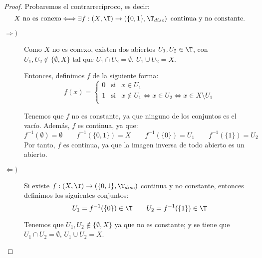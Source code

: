 \begin{proof}
    Probaremos el contrarrecíproco, es decir:
    \begin{equation*}
        X \text{ no es conexo} \Longleftrightarrow \exists f:(X,\T)\to \left(\{0,1\},\T_{disc}\right) \text{ continua y no constante.}
    \end{equation*}
    \begin{description}
        \item[$\Longrightarrow)$] Como $X$ no es conexo, existen dos abiertos $U_1,U_2\in \T$, con $U_1,U_2\notin \{\emptyset, X\}$ tal que $U_1\cap U_2=\emptyset$, $U_1\cup U_2=X$.

        Entonces, definimos $f$ de la siguiente forma:
        \begin{equation*}
            f(x) = \left\{\begin{array}{ccl}
                0 & \text{si} & x\in U_1 \\
                1 & \text{si} & x\notin U_1 \Longleftrightarrow x\in U_2\Longleftrightarrow x\in X\setminus U_1 \\
            \end{array}\right.
        \end{equation*}

        Tenemos que $f$ no es constante, ya que ninguno de los conjuntos es el vacío. Además, $f$ es continua, ya que:
        \begin{equation*}
            f^{-1}(\emptyset)=\emptyset
            \qquad 
            f^{-1}(\{0,1\})=X
            \qquad 
            f^{-1}(\{0\})=U_1
            \qquad 
            f^{-1}(\{1\})=U_2
        \end{equation*}
        Por tanto, $f$ es continua, ya que la imagen inversa de todo abierto es un abierto.

        \item[$\Longleftarrow)$] Si existe $f:(X,\T)\to \left(\{0,1\},\T_{disc}\right)$ continua y no constante, entonces definimos los siguientes conjuntos:
        \begin{equation*}
            U_1=f^{-1}(\{0\})\in \T
            \qquad
            U_2=f^{-1}(\{1\})\in \T
        \end{equation*}

        Tenemos que $U_1,U_2\notin \{\emptyset, X\}$ ya que no es constante; y se tiene que $U_1\cap U_2=\emptyset$, $U_1\cup U_2 = X$.
    \end{description}
\end{proof}

